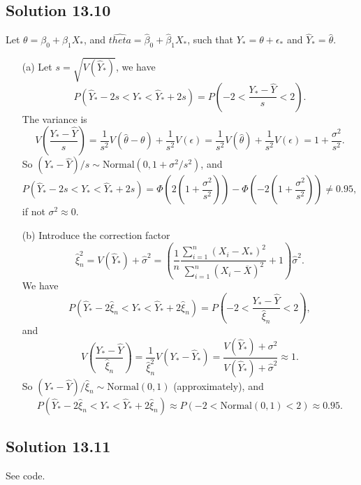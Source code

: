\subsection*{Solution 13.10}

Let $\theta = \beta_0 + \beta_1 X_*$, and $\hat{theta} = \hat{\beta}_0 + \hat{\beta}_1 X_*$, such that $Y_* = \theta + \epsilon_*$ and $\hat{Y}_* = \hat{\theta}$.

\begin{itemize}
    \item[(a)] Let $s = \sqrt{V(\hat{Y}_*)}$, we have
        \begin{equation*}
            P\left(\hat{Y}_* - 2s < Y_* < \hat{Y}_* + 2s\right)
                = P\left(-2 < \frac{Y_* - \hat{Y}}{s} < 2\right).
        \end{equation*}
        The variance is
        \begin{equation*}
            V\left(\frac{Y_* - \hat{Y}}{s}\right)
                = \frac{1}{s^2}V\left(\hat{\theta} - \theta\right) + \frac{1}{s^2}V(\epsilon)
                = \frac{1}{s^2}V(\hat{\theta}) + \frac{1}{s^2}V(\epsilon)
                = 1 + \frac{\sigma^2}{s^2}.
        \end{equation*}
        So $(Y_* - \hat{Y})/s \sim \mathrm{Normal}(0, 1 + \sigma^2/s^2)$, and
        \begin{equation*}
            P\left(\hat{Y}_* - 2s < Y_* < \hat{Y}_* + 2s\right)
                = \Phi\left(2\left(1 + \frac{\sigma^2}{s^2}\right)\right) - \Phi\left(-2\left(1 + \frac{\sigma^2}{s^2}\right)\right)
                \neq 0.95,
        \end{equation*}
        if not $\sigma^2 \approx 0$.
    \item[(b)] Introduce the correction factor
        \begin{equation*}
            \hat{\xi}_n^2 = V(\hat{Y}_*) + \hat{\sigma}^2
                = \left(\frac{1}{n} \frac{\sum_{i = 1}^n (X_i - X_*)^2}{\sum_{i = 1}^n (X_i - \overline{X})^2} + 1\right) \hat{\sigma}^2.
        \end{equation*}
        We have
        \begin{equation*}
            P\left(\hat{Y}_* - 2\hat{\xi}_n < Y_* < \hat{Y}_* + 2\hat{\xi}_n\right)
                = P\left(-2 < \frac{Y_* - \hat{Y}}{\hat{\xi}_n} < 2\right),
        \end{equation*}
        and
        \begin{equation*}
            V\left(\frac{Y_* - \hat{Y}}{\hat{\xi}_n}\right)
                = \frac{1}{\hat{\xi}_n^2} V(Y_* - \hat{Y}_*)
                = \frac{V(\hat{Y}_*) + \sigma^2}{V(\hat{Y}_*) + \hat{\sigma}^2}
                \approx 1.
        \end{equation*}
        So $(Y_* - \hat{Y})/\hat{\xi}_n \sim \mathrm{Normal}(0, 1)$ (approximately), and
        \begin{equation*}
            P\left(\hat{Y}_* - 2\hat{\xi}_n < Y_* < \hat{Y}_* + 2\hat{\xi}_n\right)
                \approx P(-2 < \mathrm{Normal}(0, 1) < 2)
                \approx 0.95.
        \end{equation*}
\end{itemize}


\subsection*{Solution 13.11}

See code.
